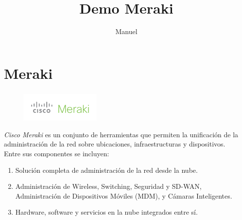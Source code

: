 \documentclass{beamer}
\begin{document}


\title{Demo Meraki}
\author{Manuel}

\frame{\titlepage}

\section{\hspace{1in}Meraki}
\begin{frame}
\frametitle{\currentname}
\begin{figure}[H]
\includegraphics[width=4cm]{img/meraki.png}
\end{figure}
\emph{Cisco Meraki} es un conjunto de herramientas que permiten la unificación de la administración de la red sobre ubicaciones, infraestructuras y dispositivos. \\ 
Entre sus componentes se incluyen:
\begin{enumerate}
\item Solución completa de administración de la red desde la nube.
\item Administración de Wireless, Switching, Seguridad y SD-WAN, Administración de Dispositivos Móviles (MDM), y Cámaras Inteligentes.
\item Hardware, software y servicios en la nube integrados entre sí.
\end{enumerate}
\end{frame}
\end{document}
